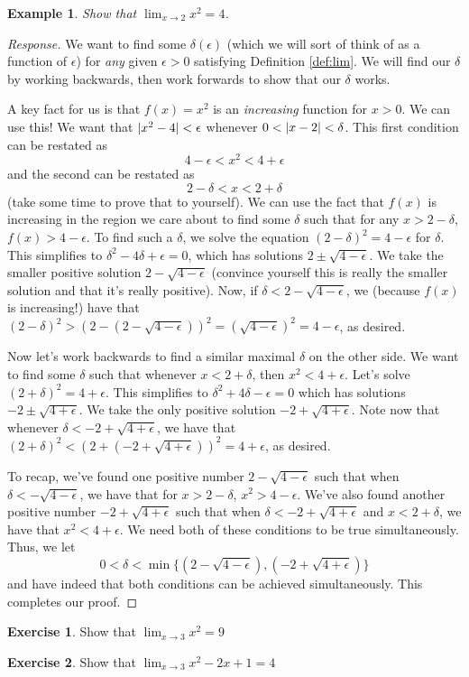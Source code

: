 \documentclass[english]{book}
\DeclarePairedDelimiter\abs{\lvert}{\rvert}%
\newtheorem{example}[theorem]{Example}
\theoremstyle{remark}
\theoremstyle{definition}
\newtheorem{excs}{Exercise}
\newtheorem*{next week}{Next Week}
\newcommand{\dlim}{\displaystyle\lim}
\begin{document}
\begin{example}
	Show that $\dlim_{x\to 2}x^2=4$. 
\end{example}
\begin{proof}[Response]
	We want to find some $\delta(\epsilon)$ (which we will sort of think of as a function of $\epsilon$) for \emph{any} given $\epsilon>0$ satisfying Definition \ref{def:lim}. We will find our $\delta$ by working backwards, then work forwards to show that our $\delta$ works.

A key fact for us is that $f(x)=x^2$ is an \emph{increasing} function for $x>0$. We can use this! We want that $\abs{x^2-4}<\epsilon$ whenever $0<\abs{x-2}<\delta$. This first condition can be restated as $$4-\epsilon< x^2<4+\epsilon$$ and the second can be restated as $$2-\delta <x<2+\delta$$ (take some time to prove that to yourself).
We can use the fact that $f(x)$ is increasing in the region we care about to find some $\delta$ such that for any $x>2-\delta$, $f(x)>4-\epsilon$. To find such a $\delta$, we solve the equation $(2-\delta)^2=4-\epsilon$ for $\delta$. This simplifies to $\delta^2-4\delta+\epsilon=0$, which has solutions $2\pm \sqrt{4-\epsilon}$. We take the smaller positive solution $2-\sqrt{4-\epsilon}$ (convince yourself this is really the smaller solution and that it's really positive). Now, if $\delta<2-\sqrt{4-\epsilon}$, we (because $f(x)$ is increasing!) have that $(2-\delta)^2>(2-(2-\sqrt{4-\epsilon}))^2=(\sqrt{4-\epsilon})^2=4-\epsilon$, as desired.

Now let's work backwards to find a similar maximal $\delta$ on the other side. We want to find some $\delta$ such that whenever $x<2+\delta$, then $x^2<4+\epsilon$. Let's solve $(2+\delta)^2=4+\epsilon$. This simplifies to $\delta^2+4\delta-\epsilon=0$ which has solutions $-2\pm \sqrt{4+\epsilon}$. We take the only positive solution $-2+\sqrt{4+\epsilon}$. Note now that whenever $\delta<-2+\sqrt{4+\epsilon}$, we have that $(2+\delta)^2<(2+(-2+\sqrt{4+\epsilon}))^2=4+\epsilon$, as desired.

To recap, we've found one positive number $2-\sqrt{4-\epsilon}$ such that when $\delta<-\sqrt{4-\epsilon}$, we have that for $x>2-\delta$, $x^2>4-\epsilon$. We've also found another positive number $-2+\sqrt{4+\epsilon}$ such that when $\delta<-2+\sqrt{4+\epsilon}$ and $x<2+\delta$, we have that $x^2<4+\epsilon$. We need both of these conditions to be true simultaneously. Thus, we let $$0<\delta< \min \{(2-\sqrt{4-\epsilon}),(-2+\sqrt{4+\epsilon})\}$$ and have indeed that both conditions can be achieved simultaneously. This completes our proof. 
\end{proof}
\begin{excs} Show that $\dlim_{x\to 3}x^2=9$

	\end{excs}
\begin{excs} Show that $\dlim_{x\to 3}x^2-2x+1=4$
	
\end{excs}
\end{document}
